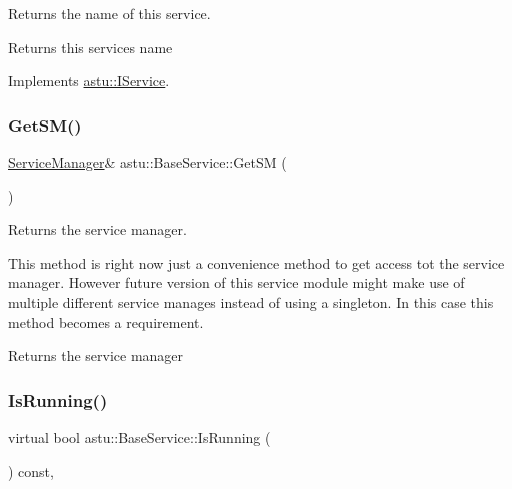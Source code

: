 Returns the name of this service.

\begin{DoxyReturn}{Returns}
this service\textquotesingle{}s name 
\end{DoxyReturn}


Implements \hyperlink{classastu_1_1IService_a7bfb508c07816c701ceaa72928213380}{astu\+::\+I\+Service}.

\mbox{\label{classastu_1_1BaseService_a646b6c83a9ebd26fe4e7796b5afde612}} 
\subsubsection{\texorpdfstring{Get\+S\+M()}{GetSM()}}
{\footnotesize\ttfamily \hyperlink{classastu_1_1ServiceManager}{Service\+Manager}\& astu\+::\+Base\+Service\+::\+Get\+SM (\begin{DoxyParamCaption}{ }\end{DoxyParamCaption})\hspace{0.3cm}{\ttfamily [protected]}}

Returns the service manager.

This method is right now just a convenience method to get access tot the service manager. However future version of this service module might make use of multiple different service manages instead of using a singleton. In this case this method becomes a requirement.

\begin{DoxyReturn}{Returns}
the service manager 
\end{DoxyReturn}
\mbox{\label{classastu_1_1BaseService_af6f4641c045343d329a0fc1ecc6a9778}} 
\subsubsection{\texorpdfstring{Is\+Running()}{IsRunning()}}
{\footnotesize\ttfamily virtual bool astu\+::\+Base\+Service\+::\+Is\+Running (\begin{DoxyParamCaption}{ }\end{DoxyParamCaption}) const\hspace{0.3cm}{\ttfamily [override]}, {\ttfamily [virtual]}}

